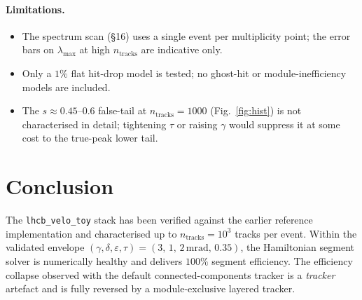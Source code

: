\documentclass[11pt,a4paper]{article}
\newcommand{\nt}{n_\text{tracks}}
\newcommand{\eps}{\varepsilon}
\begin{document}
\paragraph{Limitations.}
\begin{itemize}
  \item The spectrum scan (\S16) uses a single event per multiplicity
        point; the error bars on $\lambda_\mathrm{max}$ at high $\nt$
        are indicative only.
  \item Only a $1\%$ flat hit-drop model is tested; no ghost-hit or
        module-inefficiency models are included.
  \item The $s\approx 0.45$--$0.6$ false-tail at $\nt=1000$
        (Fig.~\ref{fig:hist}) is not characterised in detail;
        tightening $\tau$ or raising $\gamma$ would suppress it at
        some cost to the true-peak lower tail.
\end{itemize}

\section{Conclusion}\label{sec:conclusion}

The \texttt{lhcb\_velo\_toy} stack has been verified against the
earlier reference implementation and characterised up to
$\nt = 10^3$ tracks per event. Within the validated envelope
$(\gamma,\delta,\eps,\tau) = (3,\,1,\,2\,\mathrm{mrad},\,0.35)$, the
Hamiltonian segment solver is numerically healthy and delivers
$100\%$ segment efficiency. The efficiency collapse observed with the
default connected-components tracker is a \emph{tracker} artefact and
is fully reversed by a module-exclusive layered tracker.




\end{document}
